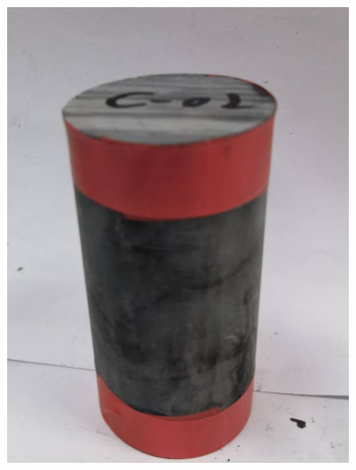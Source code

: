 \begin{figure}[ht!]
{\begin{minipage}{6cm}
            \includegraphics[width=0.9\textwidth]{img/chap2/C-2.jpg}
        \end{minipage}
    }
	

\end{figure}
